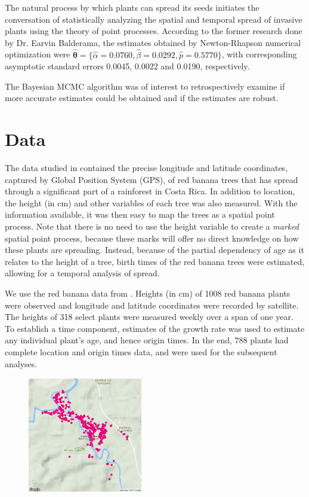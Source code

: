 \documentclass[11pt]{article}\usepackage[]{graphicx}\usepackage[]{color}
\newcommand{\bfig}{\begin{figure}}
\newcommand{\efig}{\end{figure}}
\begin{document}
{The natural process by which plants can spread its seeds initiates the conversation of statistically analyzing the spatial and temporal spread of invasive plants using the theory of point processes. According to the former research done by Dr. Earvin Balderama, the estimates obtained by Newton-Rhapson numerical optimization were $\boldsymbol{\hat\theta} = \{\hat\alpha = 0.0760, \hat\beta = 0.0292, \hat p = 0.5770\}$, with corresponding asymptotic standard errors 0.0045, 0.0022 and 0.0190, respectively. 

The Bayesian MCMC algorithm was of interest to retrospectively examine if more accurate estimates could be obtained and if the estimates are robust.
\section{Data}



The data studied in \cite{Balderama12} contained the precise longitude and latitude coordinates, captured by Global Position System (GPS), of red banana trees that has spread through a significant part of a rainforest in Costa Rica. In addition to location, the height (in cm) and other variables of each tree was also measured. With the information available, it was then easy to map the trees as a spatial point process. Note that there is no need to use the height variable to create a {\it marked} spatial point process, because these marks will offer no direct knowledge on how these plants are spreading. Instead, because of the partial dependency of age as it relates to the height of a tree, birth times of the red banana trees were estimated, allowing for a temporal analysis of spread.


We use the red banana data from \cite{Balderama12}. Heights (in cm) of 1008 red banana plants were observed and longitude and latitude coordinates were recorded by satellite. The heights of 318 select plants were measured weekly over a span of one year. To establish a time component, estimates of the growth rate was used to estimate any individual plant's age, and hence origin times. In the end, 788 plants had complete location and origin times data, and were used for the subsequent analyses.

\bfig\centering
\includegraphics[width=5cm]{figures/redbanana.png}
\caption{}
\label{Map1}
\efig

}
\end{document}
